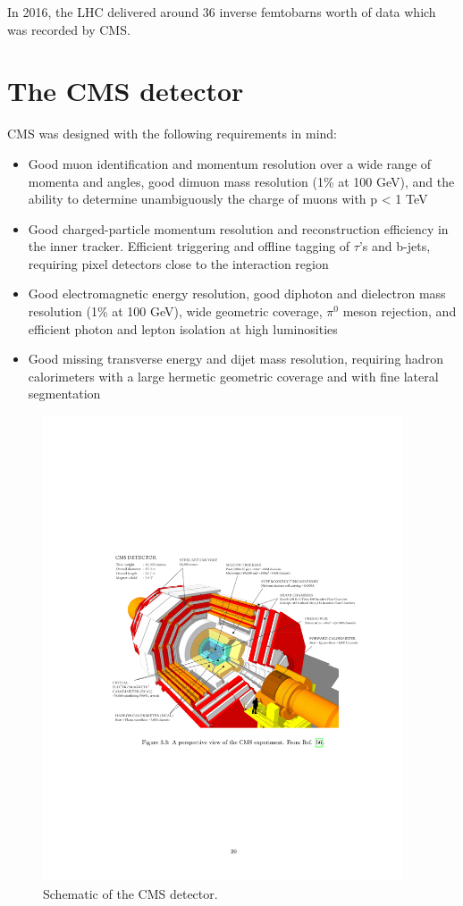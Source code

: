 In 2016, the LHC delivered around 36 inverse femtobarns worth of data which was recorded by CMS.

\section{The CMS detector}

CMS was designed with the following requirements in mind:
\begin{itemize}
\item Good muon identification and momentum resolution over a wide range of momenta and
angles, good dimuon mass resolution (1\% at 100 GeV), and the ability to determine unambiguously
the charge of muons with p < 1 TeV
\item Good charged-particle momentum resolution and reconstruction efficiency in the inner
tracker. Efficient triggering and offline tagging of $\tau$'s and b-jets, requiring pixel detectors
close to the interaction region
\item Good electromagnetic energy resolution, good diphoton and dielectron mass resolution (1\% at 100 GeV),
wide geometric coverage, ${\pi}^{0}$ meson rejection, and efficient photon and lepton
isolation at high luminosities
\item Good missing transverse energy and dijet mass resolution, requiring hadron calorimeters
with a large hermetic geometric coverage and with fine lateral segmentation
\end{itemize}

\begin{figure}[hb]
\centering
\includegraphics[width=0.95\textwidth]{figures/cms_detector.pdf}
\caption{Schematic of the CMS detector.}
\label{fig:cmsdetector}
\end{figure}

